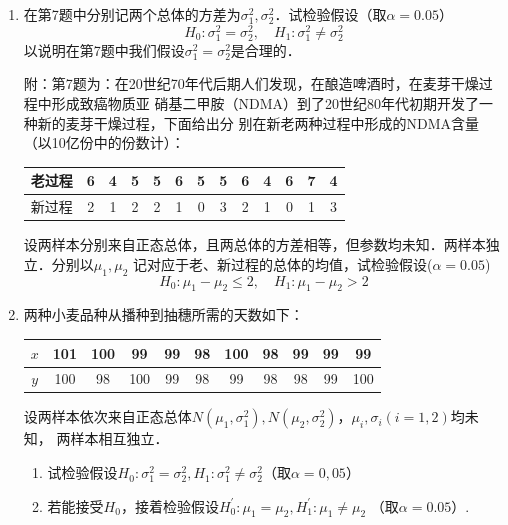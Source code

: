 \begin{enumerate}
    \item 在第7题中分别记两个总体的方差为$\sigma_1^2,\sigma_2^2$．试检验假设（取$\alpha=0.05$）
    $$H_0:\sigma_1^2=\sigma_2^2, \quad H_1:\sigma_1^2\neq \sigma^2_2$$
    以说明在第7题中我们假设$\sigma_1^2=\sigma_2^2$是合理的．
    
    {\kaishu 附：第7题为：在20世纪70年代后期人们发现，在酿造啤酒时，在麦芽干燥过程中形成致癌物质亚
    硝基二甲胺（NDMA）到了20世纪80年代初期开发了一种新的麦芽干燥过程，下面给出分
    别在新老两种过程中形成的NDMA含量（以10亿份中的份数计）：
    \renewcommand{\arraystretch}{1.3}
    \begin{table}[H]\centering
    \begin{tabular}{c|cccccccccccc}
    老过程 & 6 & 4 & 5 & 5 & 6 & 5 & 5 & 6 & 4 & 6 & 7 & 4 \\ \hline
    新过程 & 2 & 1 & 2 & 2 & 1 & 0 & 3 & 2 & 1 & 0 & 1 & 3
    \end{tabular}
    \end{table}
    \renewcommand{\arraystretch}{1.0}
    设两样本分别来自正态总体，且两总体的方差相等，但参数均未知．两样本独立．分别以$\mu_1,\mu_2$
    记对应于老、新过程的总体的均值，试检验假设($\alpha=0.05$)
    $$H_0:\mu_1-\mu_2\leq 2,\quad H_1:\mu_1-\mu_2>2$$}




    \item 两种小麦品种从播种到抽穗所需的天数如下：
    \renewcommand{\arraystretch}{1.3}   
    \begin{table}[H]\centering
        \begin{tabular}{c|cccccccccc}
        $x$ & 101 & 100 & 99  & 99 & 98 & 100 & 98 & 99 & 99 & 99  \\ \hline
        $y$ & 100 & 98  & 100 & 99 & 98 & 99  & 98 & 98 & 99 & 100
        \end{tabular}
    \end{table}
    \renewcommand{\arraystretch}{1.0}
    设两样本依次来自正态总体$N(\mu_1,\sigma_1^2),N(\mu_2,\sigma_2^2)$，$\mu_i,\sigma_i(i=1,2)$均未知，
    两样本相互独立．
    \begin{enumerate}
        \item 试检验假设$H_0:\sigma_1^2=\sigma_2^2,H_1:\sigma_1^2\neq \sigma_2^2$（取$\alpha=0,05$）
        \item 若能接受$H_0$，接着检验假设$H^\prime_0:\mu_1=\mu_2,H^\prime_1:\mu_1\neq \mu_2$ （取$\alpha=0.05$）.
    \end{enumerate}





\end{enumerate}
